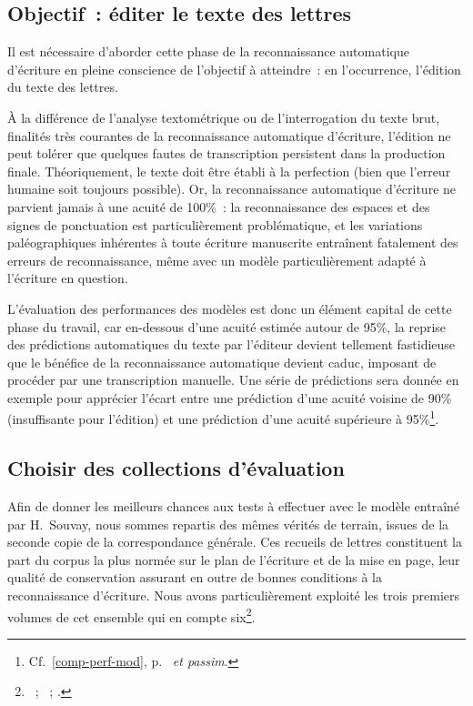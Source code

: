 \documentclass[a4paper,12pt,twoside]{book}
\begin{document}
			\subsection{Objectif~: éditer le texte des lettres}
				Il est nécessaire d'aborder cette phase de la reconnaissance automatique d'écriture en pleine conscience de l'objectif à atteindre~: en l'occurrence, l'édition du texte des lettres.
				
				À la différence de l'analyse textométrique ou de l'interrogation du texte brut, finalités très courantes de la reconnaissance automatique d'écriture, l'édition ne peut tolérer que quelques fautes de transcription persistent dans la production finale. Théoriquement, le texte doit être établi à la perfection (bien que l'erreur humaine soit toujours possible). Or, la reconnaissance automatique d'écriture ne parvient jamais à une acuité de 100\%~: la reconnaissance des espaces et des signes de ponctuation est particulièrement problématique, et les variations paléographiques inhérentes à toute écriture manuscrite entraînent fatalement des erreurs de reconnaissance, même avec un modèle particulièrement adapté à l'écriture en question.
				
				L'évaluation des performances des modèles est donc un élément capital de cette phase du travail, car en-dessous d'une acuité estimée autour de 95\%, la reprise des prédictions automatiques du texte par l'éditeur devient tellement fastidieuse que le bénéfice de la reconnaissance automatique devient caduc, imposant de procéder par une transcription manuelle. Une série de prédictions sera donnée en exemple pour apprécier l'écart entre une prédiction d'une acuité voisine de 90\% (insuffisante pour l'édition) et une prédiction d'une acuité supérieure à 95\%\footnote{Cf.~\ref{comp-perf-mod}, p.~\pageref{comp-perf-mod} \textit{et passim}.}.
				
			\subsection{Choisir des collections d'évaluation}
				Afin de donner les meilleurs chances aux tests à effectuer avec le modèle entraîné par H.~Souvay, nous sommes repartis des mêmes vérités de terrain, issues de la seconde copie de la correspondance générale. Ces recueils de lettres constituent la part du corpus la plus normée sur le plan de l'écriture et de la mise en page, leur qualité de conservation assurant en outre de bonnes conditions à la reconnaissance d'écriture. Nous avons particulièrement exploité les trois premiers volumes de cet ensemble qui en compte six\footnote{\cite{salmCorrespondanceGeneraleSecondea}~; \cite{salmCorrespondanceGeneraleSeconde}~; \cite{salmCorrespondanceGeneraleSecondeb}.}.
				
\end{document}
